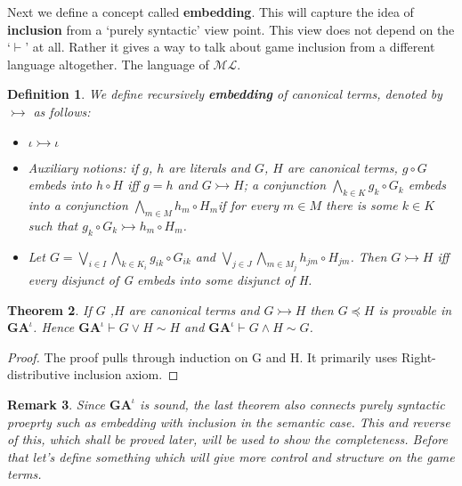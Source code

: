 \documentclass[10pt]{article}
\newcommand{\ml}{\mathcal{ML}}
\newcommand{\id}{\iota}
\newcommand{\cle}{\preccurlyeq}
\newtheorem{theorem}{Theorem}
\newtheorem{definition}[theorem]{Definition}
\newtheorem{remark}[theorem]{Remark}
\begin{document}
		Next we define a concept called  \textbf{embedding}. This will capture the idea of \textbf{inclusion} from a `purely syntactic' view point. This view does not depend on the `$\vdash$' at all. Rather it gives a way to talk about game inclusion from a different language altogether. The language of $\ml$.
		\begin{definition}
			We define recursively \textbf{embedding} of canonical terms, denoted by $\rightarrowtail$ as follows:
			
			\begin{itemize}
				\item $\id \rightarrowtail \iota$
				\item Auxiliary notions: if $g$, $h$ are literals and $G$, $H$ are canonical terms, $g\circ G$
				embeds into $h\circ H$ iﬀ $g=h$ and $G \rightarrowtail H$; a conjunction $\bigwedge_{k \in K}g_k\circ G_k$ embeds into a conjunction $\bigwedge_{m \in M}h_m\circ H_m$if for every $m\in M$ there is some $k\in K$ such that $g_k\circ G_k \rightarrowtail h_m \circ H_m$.
				\item Let $G = \bigvee_{i\in I} \bigwedge_{k \in K_i} g_{ik}\circ G_{ik} $ and $
				\bigvee_{j\in J} \bigwedge_{m \in M_j} h_{jm}\circ H_{jm} $. Then $G \rightarrowtail H$  iff every disjunct of G embeds into some disjunct of H.
			\end{itemize}
		\end{definition}
		
		\begin{theorem}\label{th9}
			If $G$ ,$H$  are canonical terms and $G\rightarrowtail H$ then $G\cle H$ is	provable in $\textbf{GA}^\id$. Hence $\textbf{GA}^\id \vdash G \lor H \sim H$ and $\textbf{GA}^\id \vdash G \land H \sim G$.
		\end{theorem}
		\begin{proof}
			The proof pulls through induction on G and H. It primarily uses Right-distributive inclusion axiom.
		\end{proof}
		\begin{remark}
			Since $\textbf{GA}^\id$ is sound, the last theorem also connects purely syntactic proeprty such as embedding with inclusion in the semantic case. This and reverse  of this, which shall be proved later, will be used to show the completeness. Before that let's define something which will give more control and structure on the game terms. 
		\end{remark} 
\end{document}
